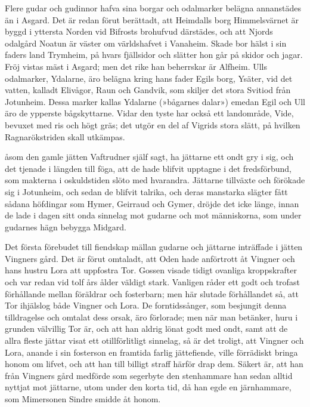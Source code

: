Flere gudar och gudinnor hafva sina borgar och odalmarker belägna
annanstädes än i Asgard. Det är redan förut berättadt, att Heimdalls
borg Himmelsvärnet är byggd i yttersta Norden vid Bifrosts brohufvud
därstädes, och att Njords odalgård Noatun är väster om världshafvet i
Vanaheim. Skade bor hälst i sin faders land Trymheim, på hvars
fjällsidor och slätter hon går på skidor och jagar. Fröj vistas mäst i
Asgard; men det rike han beherrskar är Alfheim. Ulls odalmarker,
Ydalarne, äro belägna kring hans fader Egils borg, Ysäter, vid det
vatten, kalladt Elivågor, Raun och Gandvik, som skiljer det stora
Svitiod från Jotunheim. Dessa marker kallas Ydalarne (»bågarnes dalar»)
emedan Egil och Ull äro de ypperste bågskyttarne. Vidar den tyste har
också ett landområde, Vide, bevuxet med ris och högt gräs; det utgör en
del af Vigrids stora slätt, på hvilken Ragnarökstriden skall utkämpas.



\dropcapS åsom den gamle jätten Vaftrudner själf sagt, ha jättarne ett ondt gry i
sig, och det tjenade i längden till föga, att de hade blifvit upptagne i
det fredsförbund, som makterna i oskuldstiden slöto med hvarandra.
Jättarne tillväxte och förökade sig i Jotunheim, och sedan de blifvit
talrika, och deras manstarka slägter fått sådana höfdingar som Hymer,
Geirraud och Gymer, dröjde det icke länge, innan de lade i dagen sitt
onda sinnelag mot gudarne och mot människorna, som under gudarnes hägn
bebygga Midgard.

Det första förebudet till fiendskap mällan gudarne och jättarne
inträffade i jätten Vingners gård. Det är förut omtaladt, att Oden hade
anförtrott åt Vingner och hans hustru Lora att uppfostra Tor. Gossen
visade tidigt ovanliga kroppskrafter och var redan vid tolf års ålder
väldigt stark. Vanligen råder ett godt och trofast förhållande mellan
föräldrar och fosterbarn; men här slutade förhållandet så, att Tor
ihjälslog både Vingner och Lora. De forntidssånger, som besjungit denna
tilldragelse och omtalat dess orsak, äro förlorade; men när man
betänker, huru i grunden välvillig Tor är, och att han aldrig lönat godt
med ondt, samt att de allra fleste jättar visat ett otillförlitligt
sinnelag, så är det troligt, att Vingner och Lora, anande i sin
fosterson en framtida farlig jättefiende, ville förrädiskt bringa honom
om lifvet, och att han till billigt straff härför drap dem. Säkert är,
att han från Vingners gård medförde som segerbyte den stenhammare han
sedan alltid nyttjat mot jättarne, utom under den korta tid, då han egde
en järnhammare, som Mimersonen Sindre smidde åt honom.

